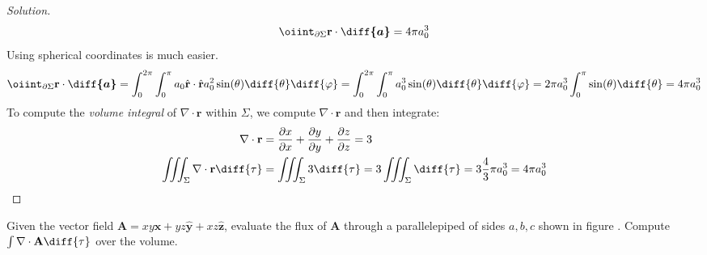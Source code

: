 \documentclass[crop=false,class=article,oneside]{standalone}
\begin{document}
\begin{proof}[Solution]
            \begin{equation*}
                \oiint_{\partial\Sigma}
                \mathbf{r}\cdot\boldsymbol{\diff{a}}
                =4\pi{a_{0}^{3}}
            \end{equation*}
            Using spherical coordinates is much easier.
            \begin{equation*}
                \oiint_{\partial\Sigma}
                \mathbf{r}\cdot\boldsymbol{\diff{a}}
                =\int_{0}^{2\pi}\int_{0}^{\pi}a_{0}
                \hat{\mathbf{r}}\cdot
                \hat{\mathbf{r}}a_{0}^{2}
                \sin(\theta)\diff{\theta}\diff{\varphi}
                =\int_{0}^{2\pi}\int_{0}^{\pi}a_{0}^{3}
                \sin(\theta)\diff{\theta}\diff{\varphi}
                =2\pi a_{0}^{3}\int_{0}^{\pi}
                \sin(\theta)\diff{\theta}=4\pi{a_{0}^{3}}
            \end{equation*}
            To compute the \textit{volume integral} of
            $\nabla\cdot\mathbf{r}$ within $\Sigma$,
            we compute $\nabla\cdot\mathbf{r}$
            and then integrate:
            \begin{align*}
                \nabla\cdot\mathbf{r}
                &=\frac{\partial{x}}{\partial{x}}
                +\frac{\partial{y}}{\partial{y}}
                +\frac{\partial{z}}{\partial{z}}=3\\
                \iiint_{\Sigma}
                \nabla\cdot\mathbf{r}\diff{\tau}
                &=\iiint_{\Sigma}3\diff{\tau}
                 =3\iiint_{\Sigma}\diff{\tau}
                 =3\frac{4}{3}\pi{a_{0}^{3}}
                 =4\pi{a_{0}^{3}}
            \end{align*}
        \end{proof} 
        \begin{problem}[Wangsness 1-13]
            \label{problem:EMAG_1_wangsness_1_13}
            Given the vector field
            $\mathbf{A}=%
             xy\hat{\mathbf{x}}%
             +yz\hat{\mathbf{y}}%
             +xz\hat{\mathbf{z}}$,
            evaluate the flux of $\mathbf{A}$
            through a parallelepiped of sides $a,b,c$
            shown in figure .
            Compute $\int\nabla\cdot\mathbf{A}\diff{\tau}$
            over the volume.
        \end{problem}
\end{document}
